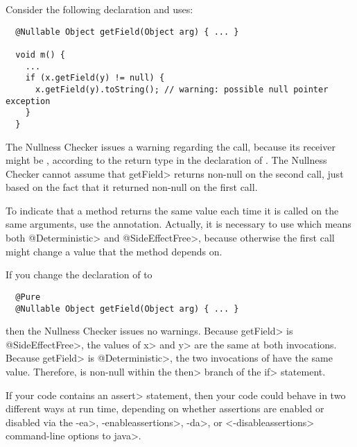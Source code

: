 
Consider the following declaration and uses:

\begin{Verbatim}
  @Nullable Object getField(Object arg) { ... }

  void m() {
    ...
    if (x.getField(y) != null) {
      x.getField(y).toString(); // warning: possible null pointer exception
    }
  }
\end{Verbatim}

The Nullness Checker issues a warning regarding the
 call, because its receiver  might
be , according to the  return type in the
declaration of .  The Nullness Checker cannot assume that
\<getField> returns non-null on the second call, just based on the fact
that it returned non-null on the first call.

To indicate that a method returns the same value each time it is called on
the same arguments, use the  annotation.
Actually, it is necessary to use  which
means both \<@Deterministic> and \<@SideEffectFree>, because otherwise the
first call might change a value that the method depends on.

If you change the declaration of  to

\begin{Verbatim}
  @Pure
  @Nullable Object getField(Object arg) { ... }
\end{Verbatim}

\noindent
then the Nullness Checker issues no warnings.
Because \<getField> is \<@SideEffectFree>, the values of \<x> and \<y> are the
same at both invocations.
Because \<getField> is \<@Deterministic>, the two invocations of
 have the same value.
Therefore,  is non-null within the \<then> branch
of the \<if> statement.




If your code contains an \<assert> statement, then your code could behave
in two different ways at run time, depending on whether assertions are
enabled or disabled via the \<-ea>, \<-enableassertions>, \<-da>, or
<-disableassertions> command-line options to \<java>.

